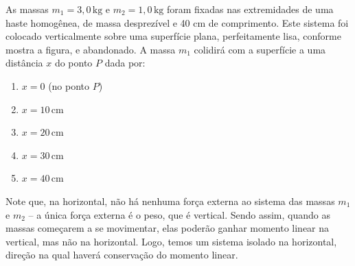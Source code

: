 \begin{exemplo}\label{exemplo_newton_conservacaomomentolinearex03}

As massas $m_1 = 3{,}0\,\text{kg}$ e $m_2 = 1{,}0\,\text{kg}$ foram fixadas nas extremidades de uma haste homogênea, de massa desprezível e 40 cm de comprimento. Este sistema foi colocado verticalmente sobre uma superfície plana, perfeitamente lisa, conforme mostra a figura, e abandonado. A massa $m_1$ colidirá com a superfície a uma distância $x$ do ponto $P$ dada por:

\begin{center}
\end{center}


\begin{enumerate}
    \item [a)] $x = 0$ (no ponto $P$)
    \item [b)] $x = 10\,\text{cm}$
    \item [c)] $x = 20\,\text{cm}$
    \item [d)] $x = 30\,\text{cm}$
    \item [e)] $x = 40\,\text{cm}$
\end{enumerate}


\resolucao

Note que, na horizontal, não há nenhuma força externa ao sistema das massas $m_1$ e $m_2$ -- a única força externa é o peso, que é vertical. Sendo assim, quando as massas começarem a se movimentar, elas poderão ganhar momento linear na vertical, mas não na horizontal. Logo, temos um sistema isolado na horizontal, direção na qual haverá conservação do momento linear.


\end{exemplo}
